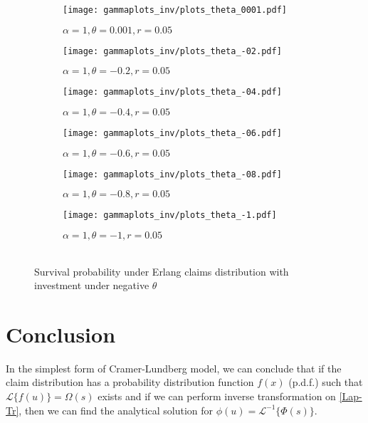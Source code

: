 \documentclass[12pt]{article}
\begin{document}
\begin{figure}[!htbp]
\begin{subfigure}{0.5\textwidth}
\texttt{[image: gammaplots\_inv/plots\_theta\_0001.pdf]} 
\caption{\(\alpha=1, \theta=0.001, r=0.05\)}
\label{gamma_inv_theta0001}
\end{subfigure}
\begin{subfigure}{0.5\textwidth}
\texttt{[image: gammaplots\_inv/plots\_theta\_-02.pdf]} 
\caption{\(\alpha=1, \theta=-0.2, r=0.05\)}
\label{gamma_inv_theta-02}
\end{subfigure}
\begin{subfigure}{0.5\textwidth}
\texttt{[image: gammaplots\_inv/plots\_theta\_-04.pdf]} 
\caption{\(\alpha=1, \theta=-0.4, r=0.05\)}
\label{gamma_inv_theta-04}
\end{subfigure}
\begin{subfigure}{0.5\textwidth}
\texttt{[image: gammaplots\_inv/plots\_theta\_-06.pdf]} 
\caption{\(\alpha=1, \theta=-0.6, r=0.05\)}
\label{gamma_inv_theta-06}
\end{subfigure}
\begin{subfigure}{0.5\textwidth}
\texttt{[image: gammaplots\_inv/plots\_theta\_-08.pdf]} 
\caption{\(\alpha=1, \theta=-0.8, r=0.05\)}
\label{gamma_inv_theta-08}
\end{subfigure}
\begin{subfigure}{0.5\textwidth}
\texttt{[image: gammaplots\_inv/plots\_theta\_-1.pdf]} 
\caption{\(\alpha=1, \theta=-1, r=0.05\)}
\label{gamma_inv_theta-1}
\end{subfigure}
\caption{\\Survival probability under Erlang claims distribution with investment under negative \(\theta\)}
\label{fig:image7}
\end{figure}



\newpage
\section{Conclusion}

\hspace{1.2cm}In the simplest form of Cramer-Lundberg model, we can conclude that if the claim distribution has a probability distribution function \(f(x)\) (p.d.f.) such that \(\mathcal{L}\{f(u)\}=\Omega(s)\) exists and if we can perform inverse transformation on \eqref{Lap-Tr}, then we can find the analytical solution for \(\phi(u)=\mathcal{L}^{-1}\{\Phi(s)\}\).\\
\end{document}
